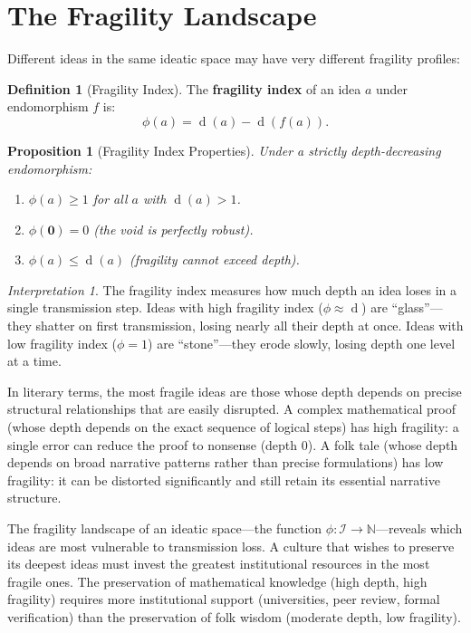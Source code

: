 \documentclass[11pt,openany]{book}
\theoremstyle{definition}
\newtheorem{definition}[axiom]{Definition}
\theoremstyle{plain}
\newtheorem{proposition}[axiom]{Proposition}
\theoremstyle{remark}
\newtheorem{interpretation}[axiom]{Interpretation}
\newcommand{\IS}{\mathcal{I}}               %
\newcommand{\void}{\mathbf{0}}              %
\newcommand{\depth}{\operatorname{d}}       %
\begin{document}
\section{The Fragility Landscape}

Different ideas in the same ideatic space may have very different fragility profiles:

\begin{definition}[Fragility Index]
The \textbf{fragility index} of an idea $a$ under endomorphism $f$ is:
\[
\phi(a) = \depth(a) - \depth(f(a)).
\]
\end{definition}

\begin{proposition}[Fragility Index Properties]
Under a strictly depth-decreasing endomorphism:
\begin{enumerate}
\item $\phi(a) \geq 1$ for all $a$ with $\depth(a) > 1$.
\item $\phi(\void) = 0$ (the void is perfectly robust).
\item $\phi(a) \leq \depth(a)$ (fragility cannot exceed depth).
\end{enumerate}
\end{proposition}

\begin{interpretation}
The fragility index measures how much depth an idea loses in a single transmission step. Ideas with high fragility index ($\phi \approx \depth$) are ``glass''---they shatter on first transmission, losing nearly all their depth at once. Ideas with low fragility index ($\phi = 1$) are ``stone''---they erode slowly, losing depth one level at a time.

In literary terms, the most fragile ideas are those whose depth depends on precise structural relationships that are easily disrupted. A complex mathematical proof (whose depth depends on the exact sequence of logical steps) has high fragility: a single error can reduce the proof to nonsense (depth 0). A folk tale (whose depth depends on broad narrative patterns rather than precise formulations) has low fragility: it can be distorted significantly and still retain its essential narrative structure.

The fragility landscape of an ideatic space---the function $\phi : \IS \to \mathbb{N}$---reveals which ideas are most vulnerable to transmission loss. A culture that wishes to preserve its deepest ideas must invest the greatest institutional resources in the most fragile ones. The preservation of mathematical knowledge (high depth, high fragility) requires more institutional support (universities, peer review, formal verification) than the preservation of folk wisdom (moderate depth, low fragility).
\end{interpretation}
\end{document}
